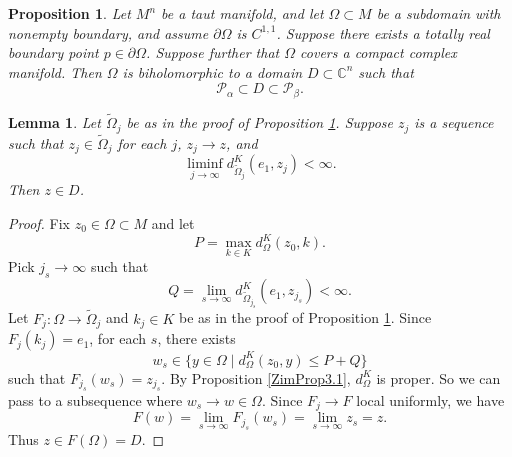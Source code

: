 \documentclass[10pt,a4paper]{amsart}
\newtheorem{proposition}{Proposition}
\newtheorem{lemma}{Lemma}
\newcommand{\C}{\mathbb{C}}
\begin{document}
\begin{proposition}
\label{MRProof1}
Let $M^n$ be a taut manifold, and let $\Omega\subset M$ be a subdomain with nonempty boundary, and assume $\partial\Omega$ is $C^{1,1}$. Suppose there exists a totally real boundary point $p\in\partial\Omega$. Suppose further that $\Omega$ covers a compact complex manifold. Then $\Omega$ is biholomorphic to a domain $D\subset\C^n$ such that
$$\mathcal{P}_{\alpha}\subset D\subset\mathcal{P}_{\beta}.$$
\end{proposition}

\begin{lemma}
\label{ZimLem4.7}
Let $\widetilde{\Omega}_j$ be as in the proof of Proposition \ref{MRProof1}. Suppose $z_j$ is a sequence such that $z_j\in\widetilde{\Omega}_j$ for each $j$, $z_j\to z$, and 
$$\liminf_{j\to\infty}d_{\widetilde{\Omega}_j}^K(e_1,z_j)<\infty.$$
Then $z\in D$.
\end{lemma}

\begin{proof}
Fix $z_0\in\Omega\subset M$ and let 
$$P=\max_{k\in K}d_{\Omega}^{K}(z_0,k).$$
Pick $j_s\to\infty$ such that 
$$Q=\lim_{s\to\infty}d_{\widetilde{\Omega}_{j_s}}^K(e_1,z_{j_s})<\infty.$$
Let $F_j:\Omega\to\widetilde{\Omega}_j$ and $k_j\in K$ be as in the proof of Proposition \ref{MRProof1}. Since $F_j(k_j)=e_1$, for each $s$, there exists
$$w_s\in\{y\in\Omega\mid d_{\Omega}^K(z_0,y)\le P+Q\}$$
such that $F_{j_s}(w_s)=z_{j_s}$. By Proposition \ref{ZimProp3.1}, $d_{\Omega}^K$ is proper. So we can pass to a subsequence where $w_s\to w\in\Omega$. Since $F_j\to F$ local uniformly, we have
$$F(w)=\lim_{s\to\infty}F_{j_s}(w_s)=\lim_{s\to\infty}z_s=z.$$
Thus $z\in F(\Omega)=D$. 
\end{proof}
\end{document}
